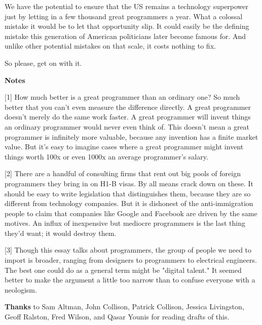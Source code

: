 We have the potential to ensure
                  that the US remains a technology superpower just by letting in
                  a few thousand great programmers a year. What a colossal
                  mistake it would be to let that opportunity slip. It could
                  easily be the defining mistake this generation of American
                  politicians later become famous for. And unlike other
                  potential mistakes on that scale, it costs nothing to fix.

So
                  please, get on with it.








                  \textbf{Notes}

[1] How much better is a great programmer than an ordinary one?
                  So much better that you can't even measure the difference
                  directly. A great programmer doesn't merely do the same work
                  faster. A great programmer will invent things an ordinary
                  programmer would never even think of. This doesn't mean a
                  great programmer is infinitely more valuable, because any
                  invention has a finite market value. But it's easy to imagine
                  cases where a great programmer might invent things worth 100x
                  or even 1000x an average programmer's salary.

[2] There are a handful of consulting firms that rent out big
                  pools of foreign programmers they bring in on H1-B visas. By
                  all means crack down on these. It should be easy to write
                  legislation that distinguishes them, because they are so
                  different from technology companies. But it is dishonest of
                  the anti-immigration people to claim that companies like
                  Google and Facebook are driven by the same motives. An influx
                  of inexpensive but mediocre programmers is the last thing
                  they'd want; it would destroy them.

[3] Though this essay talks about programmers, the group of
                  people we need to import is broader, ranging from designers to
                  programmers to electrical engineers. The best one could do as
                  a general term might be "digital talent." It seemed better to
                  make the argument a little too narrow than to confuse everyone
                  with a neologism.


                  \textbf{Thanks} to Sam Altman, John Collison, Patrick Collison,
                  Jessica Livingston, Geoff Ralston, Fred Wilson, and Qasar
                  Younis for reading drafts of this.


              
            
          
